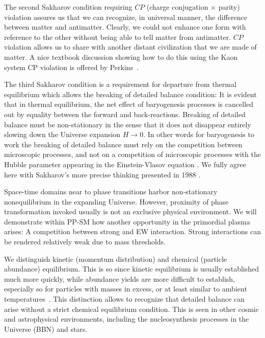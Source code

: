 The second Sakharov  condition requiring $CP$ (charge conjugation $\times$ parity)  violation assures us that we can recognize, in universal manner, the difference between matter and antimatter. Clearly, we could not enhance one form with reference to the other without being able to tell matter from antimatter. $CP$ violation allows us to share with another distant civilization that we are made of matter. A nice textbook discussion showing how to do this using the Kaon system CP violation is offered by Perkins~\cite{Perkins:1982xb}.

The third Sakharov condition  is a requirement for departure from thermal equilibrium which allows the breaking of detailed balance condition: It is evident that in thermal equilibrium, the net effect of baryogenesis processes is cancelled out by equality between the  forward and back-reactions. {\color{black}Breaking of detailed balance must be non-stationary in the sense that it does not disappear entirely slowing down the Universe expansion $H\to 0$. In other words for baryogenesis to work the breaking of detailed balance must rely on the competition between microscopic processes, and not on a competition of microscopic processes with the Hubble parameter appearing in the Einstein-Vlasov equation . We fully agree here with Sakharov's more precise thinking presented in 1988 \cite{Sakharov:1988vdp}.} 

{\color{black}Space-time domains near to phase transitions harbor non-stationary nonequilibrium in the expanding Universe. However, proximity of phase transformation invoked usually is not an exclusive physical environment. We will demonstrate within PP-SM how another opportunity in the primordial plasma arises: A competition between strong and EW interaction. Strong interactions can be rendered relatively weak due to mass thresholds.} 

We distinguish kinetic (momentum distribution) and chemical (particle abundance) equilibrium. This is so since kinetic equilibrium is usually established much more quickly, while abundance yields are more difficult to establish, especially so for particles with masses in excess, or at least similar to ambient temperatures~\cite{Koch:1986ud,Birrell:2014gea}. {\color{black}This distinction allows to recognize that detailed balance can arise without a strict chemical equilibrium condition. This is seen in other cosmic and astrophysical environments, including the nucleosynthesis processes in the Universe (BBN) and stars.}  

